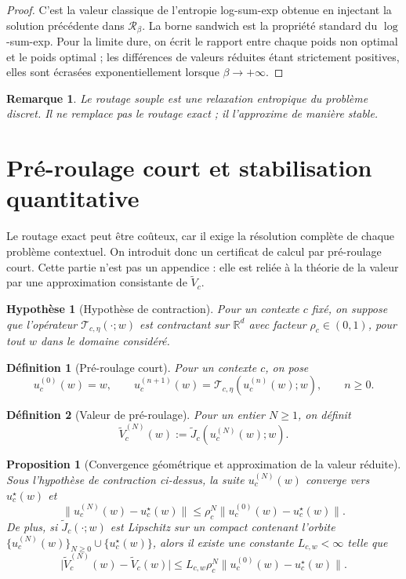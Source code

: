 \documentclass[11pt,a4paper]{article}
\newtheorem{definition}{Définition}[section]
\newtheorem{assumption}{Hypothèse}[section]
\newtheorem{proposition}{Proposition}[section]
\newtheorem{remark}{Remarque}[section]
\newcommand{\R}{\mathbb R}
\newcommand{\Tcal}{\mathcal T}
\newcommand{\Rcal}{\mathcal R}
\begin{document}
\begin{proof}
C'est la valeur classique de l'entropie log-sum-exp obtenue en injectant la solution précédente dans \(\Rcal_\beta\). La borne sandwich est la propriété standard du \(\log\)-sum-exp. Pour la limite dure, on écrit le rapport entre chaque poids non optimal et le poids optimal ; les différences de valeurs réduites étant strictement positives, elles sont écrasées exponentiellement lorsque \(\beta\to+\infty\).
\end{proof}

\begin{remark}
Le routage souple est une relaxation entropique du problème discret. Il ne remplace pas le routage exact ; il l'approxime de manière stable.
\end{remark}

\section{Pré-roulage court et stabilisation quantitative}

Le routage exact peut être coûteux, car il exige la résolution complète de chaque problème contextuel. On introduit donc un certificat de calcul par pré-roulage court. Cette partie n'est pas un appendice : elle est reliée à la théorie de la valeur par une approximation consistante de \(\widetilde V_c\).

\begin{assumption}[Hypothèse de contraction]
Pour un contexte \(c\) fixé, on suppose que l'opérateur \(\Tcal_{c,\eta}(\cdot;w)\) est contractant sur \(\R^d\) avec facteur \(\rho_c\in(0,1)\), pour tout \(w\) dans le domaine considéré.
\end{assumption}

\begin{definition}[Pré-roulage court]
Pour un contexte \(c\), on pose
\[
u_c^{(0)}(w)=w,
\qquad
u_c^{(n+1)}(w)=\Tcal_{c,\eta}(u_c^{(n)}(w);w),
\qquad n\ge 0.
\]
\end{definition}

\begin{definition}[Valeur de pré-roulage]
Pour un entier \(N\ge 1\), on définit
\[
\widetilde V_c^{(N)}(w):=\widetilde J_c(u_c^{(N)}(w);w).
\]
\end{definition}

\begin{proposition}[Convergence géométrique et approximation de la valeur réduite]
Sous l'hypothèse de contraction ci-dessus, la suite \(u_c^{(N)}(w)\) converge vers \(u_c^\star(w)\) et
\[
\|u_c^{(N)}(w)-u_c^\star(w)\|\le \rho_c^N\|u_c^{(0)}(w)-u_c^\star(w)\|.
\]
De plus, si \(\widetilde J_c(\cdot;w)\) est Lipschitz sur un compact contenant l'orbite \(\{u_c^{(N)}(w)\}_{N\ge 0}\cup\{u_c^\star(w)\}\), alors il existe une constante \(L_{c,w}<\infty\) telle que
\[
\bigl|\widetilde V_c^{(N)}(w)-\widetilde V_c(w)\bigr|
\le
L_{c,w}\rho_c^N\|u_c^{(0)}(w)-u_c^\star(w)\|.
\]
\end{proposition}
\end{document}
